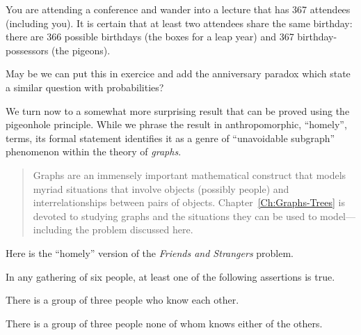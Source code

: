 \medskip

%
You are attending a conference and wander into a lecture that has 367
attendees (including you).  It is certain that at least two attendees
share the same birthday: there are 366 possible birthdays (the boxes
for a leap year) and 367 birthday-possessors (the pigeons).

{\Denis May be we can put this in exercice and add the anniversary paradox which state a similar question with probabilities?}

\medskip

%
We turn now to a somewhat more surprising result that can be proved
using the pigeonhole principle.  While we phrase the result in
anthropomorphic, ``homely'', terms, its formal statement identifies it
as a genre of ``unavoidable subgraph''
%
phenomenon within the theory of {\it graphs}.
\begin{quote}
Graphs are an immensely important mathematical construct that models
myriad situations that involve objects (possibly people) and
interrelationships between pairs of objects.
Chapter~\ref{Ch:Graphs-Trees} is devoted to studying graphs and the
situations they can be used to model---including the problem discussed
here.
\end{quote}
Here is the ``homely'' version of the {\it Friends and Strangers} problem.

\begin{prop}
\label{thm:triangle-cotriangles}
In any gathering of six people, at least one of the following
assertions is true.

There is a group of three people who know each other.

There is a group of three people none of whom knows either of the
others.
\end{prop}

